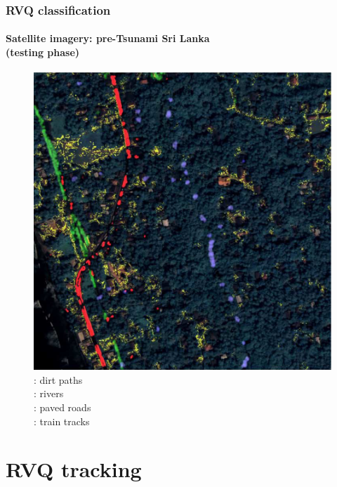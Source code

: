\begin{frame}
\frametitle{RVQ classification}
\framesubtitle{\small Satellite imagery: pre-Tsunami Sri Lanka\\(testing phase)}
\logoCSIPCPL\mypagenum
	\begin{figure}		
		\includegraphics[height=0.6\textheight]{thesis/RVQ_SatelliteSriLanka_3_labeling.png}
		\caption{: dirt paths \\: rivers \\: paved roads \\: train tracks}
	\end{figure}
\end{frame}


\section{RVQ tracking}

